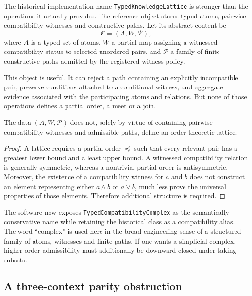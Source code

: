 The historical implementation name \texttt{TypedKnowledgeLattice} is stronger than the operations it actually provides. The reference object stores typed atoms, pairwise compatibility witnesses and constructive paths. Let its abstract content be
\[
\mathfrak C=(A,W,\mathcal P),
\]
where \(A\) is a typed set of atoms, \(W\) a partial map assigning a witnessed compatibility status to selected unordered pairs, and \(\mathcal P\) a family of finite constructive paths admitted by the registered witness policy.

This object is useful. It can reject a path containing an explicitly incompatible pair, preserve conditions attached to a conditional witness, and aggregate evidence associated with the participating atoms and relations. But none of those operations defines a partial order, a meet or a join.

\begin{proposition}
The data \((A,W,\mathcal P)\) does not, solely by virtue of containing pairwise compatibility witnesses and admissible paths, define an order-theoretic lattice.
\end{proposition}

\begin{proof}
A lattice requires a partial order \(\preceq\) such that every relevant pair has a greatest lower bound and a least upper bound. A witnessed compatibility relation is generally symmetric, whereas a nontrivial partial order is antisymmetric. Moreover, the existence of a compatibility witness for \(a\) and \(b\) does not construct an element representing either \(a\wedge b\) or \(a\vee b\), much less prove the universal properties of those elements. Therefore additional structure is required.
\end{proof}

The software now exposes \texttt{TypedCompatibilityComplex} as the semantically conservative name while retaining the historical class as a compatibility alias. The word ``complex'' is used here in the broad engineering sense of a structured family of atoms, witnesses and finite paths. If one wants a simplicial complex, higher-order admissibility must additionally be downward closed under taking subsets.

\subsection{A three-context parity obstruction}

